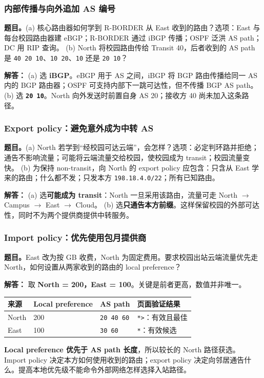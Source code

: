 \documentclass[11pt,a4paper,fontset=fandol]{ctexart}
\renewcommand{\exercisequestion}[2]{%
  \Needspace{5\baselineskip}%
  \subsubsection{#2}\label{exercise:#1}%
}
\renewenvironment{checkedsolution}
  {\par\nopagebreak[4]\textbf{解答：}\ignorespaces}
  {\par}
\begin{document}
\exercisequestion{SC2008-HW03-Q16}{内部传播与向外追加 AS 编号}
\textbf{题目。}(a) 核心路由器如何学到 R-BORDER 从 East 收到的路由？选项：East 与每台校园路由器建 eBGP；R-BORDER 通过 iBGP 传播；OSPF 泛洪 AS path；DC 用 RIP 查询。
(b) North 将校园路由传给 Transit 40，后者收到的 AS path 是 \texttt{40 20 10}、\texttt{10 20}、\texttt{10} 还是 \texttt{20 10}？
\begin{checkedsolution}
(a) 选 \textbf{iBGP}。eBGP 用于 AS 之间，iBGP 将 BGP 路由传播给同一 AS 内的 BGP 路由器；OSPF 可支持内部下一跳可达性，但不传播 BGP AS path。
(b) 选 \textbf{\texttt{20 10}}。North 向外发送时前置自身 AS 20；接收方 40 尚未加入这条路径。
\end{checkedsolution}

\exercisequestion{SC2008-HW03-Q17}{Export policy：避免意外成为中转 AS}
\textbf{题目。}(a) North 若学到“经校园可达云端”，会怎样？选项：必定判环路并拒绝；通告不影响流量；可能将云端流量交给校园，使校园成为 transit；校园流量变快。
(b) 为保持 non-transit，向 North 的 export policy 应包含：只含从 East 学来的路由；什么都不发；只发本方 \texttt{198.18.4.0/22}；所有已知路由。
\begin{checkedsolution}
(a) 选\textbf{可能成为 transit}：North 一旦采用该路由，流量可走 North $\to$ Campus $\to$ East $\to$ Cloud。
(b) 选\textbf{只通告本方前缀}。这样保留校园的外部可达性，同时不为两个提供商提供中转服务。
\end{checkedsolution}

\exercisequestion{SC2008-HW03-Q18}{Import policy：优先使用包月提供商}
\textbf{题目。}East 改为按 GB 收费，North 为固定费用。要求校园出站云端流量优先走 North，如何设置从两家收到的路由的 local preference？
\begin{checkedsolution}
取 \textbf{North = 200，East = 100}。关键是前者更高，数值并非唯一。
\begin{center}
\small
\begin{tabular}{@{}llll@{}}
\toprule
来源 & Local preference & AS path & 页面验证结果 \\
\midrule
North & 200 & \texttt{20 40 60} & \texttt{*>}：有效且最佳 \\
East & 100 & \texttt{30 60} & \texttt{*}：有效候选 \\
\bottomrule
\end{tabular}
\end{center}
\textbf{Local preference 优先于 AS path 长度}，所以较长的 North 路径获选。
Import policy 决定本方如何使用收到的路由；export policy 决定向邻居通告什么。提高本地优先级不能命令外部网络怎样选择入站路径。
\end{checkedsolution}
\end{document}
